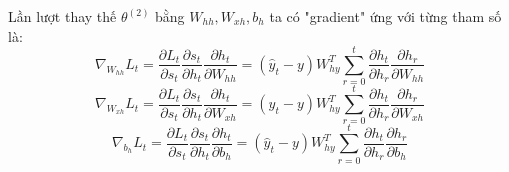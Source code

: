 Lần lượt thay thế $\theta^{(2)}$ bằng $W_{hh}, W_{xh}, b_h$ ta có "gradient" ứng với từng tham số là:
\begin{equation} \label{gradientWRTSt12}
	\nabla_{W_{hh}}L_t = \frac{\partial L_t}{\partial s_t} \frac{\partial s_t}{\partial h_t} \frac{\partial h_t}{\partial W_{hh}}  =  (\hat{y}_t - y) W_{hy}^T \sum_{r=0}^{t} \frac{\partial h_{t}}{\partial h_r} \frac{\partial h_r}{\partial W_{hh}}
\end{equation}
\begin{equation} \label{gradientWRTSt13}
	\nabla_{W_{xh}}L_t = \frac{\partial L_t}{\partial s_t} \frac{\partial s_t}{\partial h_t} \frac{\partial h_t}{\partial W_{xh}}  =  (\hat{y}_t - y) W_{hy}^T \sum_{r=0}^{t} \frac{\partial h_{t}}{\partial h_r} \frac{\partial h_r}{\partial W_{xh}}
\end{equation}
\begin{equation} \label{gradientWRTSt14}
	\nabla_{b_h}L_t = \frac{\partial L_t}{\partial s_t} \frac{\partial s_t}{\partial h_t} \frac{\partial h_t}{\partial b_h}  =  (\hat{y}_t - y) W_{hy}^T \sum_{r=0}^{t} \frac{\partial h_{t}}{\partial h_r} \frac{\partial h_r}{\partial b_h}
\end{equation}





